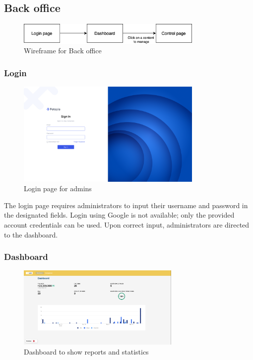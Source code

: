 \newpage
\subsection{Back office}

\begin{figure}[H]
    \centering
    \includegraphics[width=0.8\textwidth]{Figures/wireframe_bo.png}
    \caption{Wireframe for Back office}
\end{figure}

\subsubsection{Login}

\begin{figure}[H]
    \centering
    \includegraphics[width=0.8\textwidth]{Figures/UI/login_bo_ui.png}
    \caption{Login page for admins}
\end{figure}

The login page requires administrators to input their username and password in the designated fields.
Login using Google is not available; only the provided account credentials can be used. 
Upon correct input, administrators are directed to the dashboard.

\subsubsection{Dashboard}

\begin{figure}[H]
    \centering
    \includegraphics[width=0.7\textwidth]{Figures/UI/dashboard_bo_ui.png}
    \caption{Dashboard to show reports and statistics}
\end{figure}

